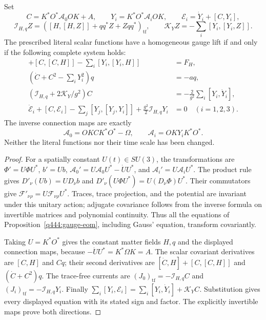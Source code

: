 \begin{proposition}
\label{q444:static-lift-system}
Set
\[
 C=K^*O^*\mathcal A_0OK+A,\qquad
 Y_i=K^*O^*\mathcal A_iOK,\qquad
 \mathcal E_i=\dot Y_i+[C,Y_i],
\]
\[
 \mathscr I_{H,q}Z=([H,[H,Z]]+qq^*Z+Zqq^*)_{\mathrm{tf}},\qquad
 \mathscr K_YZ=-\sum_i[Y_i,[Y_i,Z]].
\]
The prescribed literal scalar functions have a homogeneous gauge lift
if and only if the following complete system holds:
\begin{align}
 [\dot C,H]+[C,[C,H]]-\sum_i[Y_i,[Y_i,H]]&=F_H,
 \label{q444:static-lift-phi}\\
 (\dot C+C^2-\sum_iY_i^2)q&=-aq,
 \label{q444:static-lift-b}\\
 (\mathscr I_{H,q}+2\mathscr K_Y/g^2)C
   &=-\frac2{g^2}\sum_i[Y_i,\dot Y_i],
 \label{q444:static-lift-gauss}\\
 \dot{\mathcal E}_i+[C,\mathcal E_i]
 -\sum_j[Y_j,[Y_j,Y_i]]+\frac{g^2}{2}\mathscr I_{H,q}Y_i&=0
 \quad(i=1,2,3).
 \label{q444:static-lift-spatial}
\end{align}
The inverse connection maps are exactly
\[
 \mathcal A_0=OKCK^*O^*-\Omega,\qquad
 \mathcal A_i=OKY_iK^*O^*.
\]
Neither the literal functions nor their time scale has been changed.
\end{proposition}
\begin{proof}
For a spatially constant $U(t)\in SU(3)$, the transformations are
$\Phi'=U\Phi U^*$, $b'=Ub$,
$\mathcal A_0'=U\mathcal A_0U^*-\dot UU^*$, and
$\mathcal A_i'=U\mathcal A_iU^*$.
The product rule gives
$D'_\nu(Ub)=UD_\nu b$ and
$D'_\nu(U\Phi U^*)=U(D_\nu\Phi)U^*$.
Their commutators give $\mathcal F'_{\nu\rho}
=U\mathcal F_{\nu\rho}U^*$. Traces, trace projection, and the potential
are invariant under this unitary action; adjugate covariance follows
from the inverse formula on invertible matrices and polynomial
continuity. Thus all the equations of Proposition~\ref{q444:gauge-eom},
including Gauss' equation, transform covariantly.

Taking $U=K^*O^*$ gives the constant matter fields $H,q$ and the displayed
connection maps, because $-\dot UU^*=K^*\Omega K=A$.
The scalar covariant derivatives are $[C,H]$ and $Cq$; their second
derivatives are $[\dot C,H]+[C,[C,H]]$ and $(\dot C+C^2)q$.
The trace-free currents are
$(J_0)_{\mathrm{tf}}=-\mathscr I_{H,q}C$ and
$(J_i)_{\mathrm{tf}}=-\mathscr I_{H,q}Y_i$.
Finally
$\sum_i[Y_i,\mathcal E_i]
=\sum_i[Y_i,\dot Y_i]+\mathscr K_YC$.
Substitution gives every displayed equation with its stated sign and
factor. The explicitly invertible maps prove both directions.
\end{proof}

